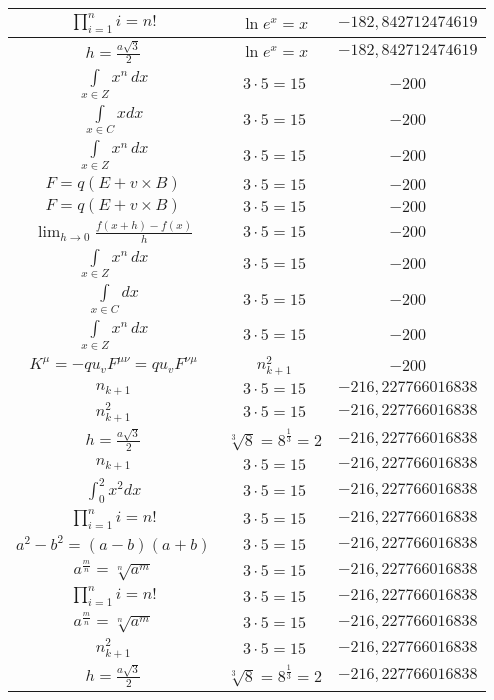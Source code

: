 \documentclass{article}
\begin{document}
\begin{flushleft}
\begin{longtable}{|c|c|c|}
$\prod_{i=1}^ni=n!$ & $\ln e^x=x$ & $-182,842712474619$ \\ \hline 
$h=\frac{a\sqrt{3}}{2}$ & $\ln e^x=x$ & $-182,842712474619$ \\ \hline 
$\int \limits_{x\in Z}\!x^{n}\,dx$ & $3\cdot 5=15$ & $-200$ \\ \hline 
$\int \limits_{x\in C}xdx$ & $3\cdot 5=15$ & $-200$ \\ \hline 
$\int \limits_{x\in Z}\!x^{n}\,dx$ & $3\cdot 5=15$ & $-200$ \\ \hline 
$F=q\left(E+v\times B\right)$ & $3\cdot 5=15$ & $-200$ \\ \hline 
$F=q\left(E+v\times B\right)$ & $3\cdot 5=15$ & $-200$ \\ \hline 
$\lim_{h\to0}\frac{f(x+h)-f(x)}{h}$ & $3\cdot 5=15$ & $-200$ \\ \hline 
$\int \limits_{x\in Z}\!x^{n}\,dx$ & $3\cdot 5=15$ & $-200$ \\ \hline 
$\int \limits_{x\in C}dx$ & $3\cdot 5=15$ & $-200$ \\ \hline 
$\int \limits_{x\in Z}\!x^{n}\,dx$ & $3\cdot 5=15$ & $-200$ \\ \hline 
$K^\mu=-qu_vF^{\mu\nu}=qu_vF^{\nu\mu}$ & $n_{k+1}^2$ & $-200$ \\ \hline 
$n_{k+1}$ & $3\cdot 5=15$ & $-216,227766016838$ \\ \hline 
$n_{k+1}^2$ & $3\cdot 5=15$ & $-216,227766016838$ \\ \hline 
$h=\frac{a\sqrt{3}}{2}$ & $\sqrt[3]{8}=8^{\frac{1}{3}}=2$ & $-216,227766016838$ \\ \hline 
$n_{k+1}$ & $3\cdot 5=15$ & $-216,227766016838$ \\ \hline 
$\int _0^2x^2dx$ & $3\cdot 5=15$ & $-216,227766016838$ \\ \hline 
$\prod_{i=1}^ni=n!$ & $3\cdot 5=15$ & $-216,227766016838$ \\ \hline 
$a^2-b^2=(a-b)(a+b)$ & $3\cdot 5=15$ & $-216,227766016838$ \\ \hline 
$a^{\frac{m}{n}}=\sqrt[n]{a^{m}}$ & $3\cdot 5=15$ & $-216,227766016838$ \\ \hline 
$\prod_{i=1}^ni=n!$ & $3\cdot 5=15$ & $-216,227766016838$ \\ \hline 
$a^{\frac{m}{n}}=\sqrt[n]{a^{m}}$ & $3\cdot 5=15$ & $-216,227766016838$ \\ \hline 
$n_{k+1}^2$ & $3\cdot 5=15$ & $-216,227766016838$ \\ \hline 
$h=\frac{a\sqrt{3}}{2}$ & $\sqrt[3]{8}=8^{\frac{1}{3}}=2$ & $-216,227766016838$ \\ \hline 

\end{longtable}
\end{flushleft}
\end{document}
